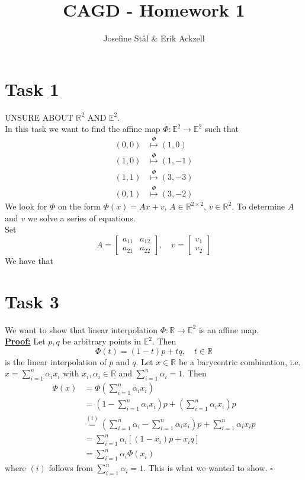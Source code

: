 \documentclass[]{article}
\title{CAGD - Homework 1}
\author{Josefine Stål \& Erik Ackzell}
\begin{document}
\maketitle
\section*{Task 1}
UNSURE ABOUT $\mathbb{R}^2$ AND $\mathbb{E}^2$.\\
In this task we want to find the affine map $\Phi:\mathbb{E}^2 \rightarrow \mathbb{E}^2$ such that \begin{equation}
\begin{aligned}
(0,0)&\overset{\Phi}{\mapsto}(1,0)\\
(1,0)&\overset{\Phi}{\mapsto}(1,-1)\\
(1,1)&\overset{\Phi}{\mapsto}(3,-3)\\
(0,1)&\overset{\Phi}{\mapsto}(3,-2)
\end{aligned}
\end{equation}
We look for $\Phi$ on the form $\Phi(x) = Ax + v$, $A\in \mathbb{R}^{2\times 2}$, $v\in \mathbb{R}^2$. To determine $A$ and $v$ we solve a series of equations.\\
Set \begin{equation*}
A=\left[\begin{array}{cc}
a_{11}&a_{12}\\
a_{21}&a_{22}
\end{array}\right], \quad v=\left[\begin{array}{c}
v_1\\
v_2
\end{array}\right]
\end{equation*}
We have that 

\section*{Task 3}
We want to show that linear interpolation $\Phi : \mathbb{R} \rightarrow \mathbb{E}^2$ is an affine map.\\
\underline{\textbf{Proof:}} Let $p,q$ be arbitrary points in $\mathbb{E}^2$. Then \begin{equation*}
\Phi (t) = (1-t)p + tq, \quad t\in \mathbb{R}
\end{equation*}
is the linear interpolation of $p$ and $q$. Let $x\in \mathbb{R}$ be a barycentric combination, i.e. $x=\sum_{i=1}^{n}\alpha_i x_i$ with $x_i, \alpha_i\in \mathbb{R}$ and $\sum_{i=1}^{n}\alpha_i = 1$. Then \begin{equation*}
\begin{aligned}
\Phi (x) &= \Phi (\sum_{i=1}^{n}\alpha_i x_i)\\
&=(1-\sum_{i=1}^{n}\alpha_i x_i)p + (\sum_{i=1}^{n}\alpha_i x_i)p\\
&\overset{(i)}{=}(\sum_{i=1}^{n}\alpha_i-\sum_{i=1}^{n}\alpha_i x_i)p + \sum_{i=1}^{n}\alpha_i x_ip\\
&=\sum_{i=1}^{n}\alpha_i[(1-x_i)p + x_iq]\\
&=\sum_{i=1}^{n}\alpha_i\Phi(x_i)
\end{aligned}
\end{equation*}
where $(i)$ follows from $\sum_{i=1}^{n}\alpha_i=1$. This is what we wanted to show. $\square$
\end{document}
